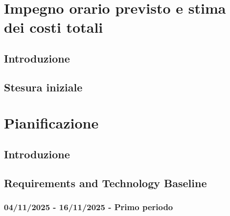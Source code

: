\documentclass[a4paper,12pt]{article}
\begin{document}

\newpage
\section{Impegno orario previsto e stima dei costi totali}
    \subsection{Introduzione}
    \subsection{Stesura iniziale}

\newpage
\section{Pianificazione}
\label{sec:pianificazione}
    \subsection{Introduzione}
    \subsection{Requirements and Technology Baseline}

        \subsubsection{04/11/2025 - 16/11/2025 - Primo periodo}
        
\end{document}
